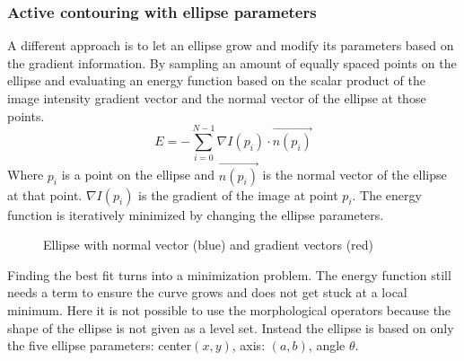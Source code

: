 \newpage
\subsubsection{Active contouring with ellipse parameters}
A different approach is to let an ellipse grow and modify its parameters based on the gradient information. By sampling an amount of equally spaced points on the ellipse and evaluating an energy function based on the scalar product of the image intensity gradient vector  and the normal vector of the ellipse at those points. 
\begin{equation}
    E = -\sum_{i=0}^{N-1} \nabla I(p_i) \cdot \vec{n(p_i)}
\end{equation} 
Where $p_i$ is a point on the ellipse and $\vec{n(p_i)}$ is the normal vector of the ellipse at that point. $\nabla I(p_i)$ is the gradient of the image at point $p_i$. The energy function is iteratively minimized by changing the ellipse parameters.
\begin{figure}[h]
    \centering
    \label{fig:normalgradientellipse}
    \caption{Ellipse with normal vector (blue) and gradient vectors (red)}
    
    \end{figure}
Finding the best fit turns into a minimization problem. The energy function still needs a term to ensure the curve grows and does not get stuck at a local minimum. Here it is not possible to use the morphological operators because the shape of the ellipse is not given as a level set. Instead the ellipse is based on only the five ellipse parameters: center$(x,y)$, axis: $(a,b)$, angle $\theta$. 

